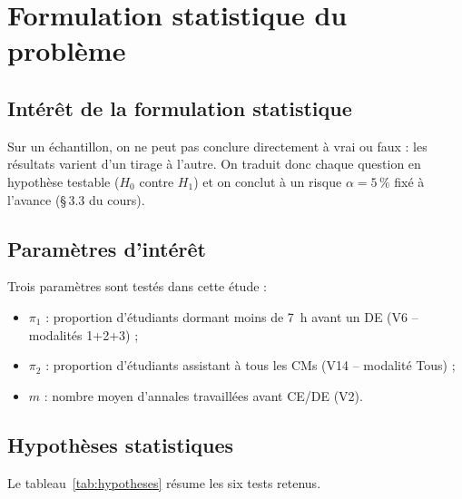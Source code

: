 
\section{Formulation statistique du problème}

\subsection{Intérêt de la formulation statistique}

Sur un échantillon, on ne peut pas conclure directement à \og{}vrai\fg{} ou
\og{}faux\fg{} : les résultats varient d'un tirage à l'autre.
On traduit donc chaque question en hypothèse testable ($H_0$ contre $H_1$) et on
conclut à un risque $\alpha = 5\,\%$ fixé à l'avance (§\,3.3 du cours).

\subsection{Paramètres d'intérêt}

Trois paramètres sont testés dans cette étude :

\begin{itemize}
  \item $\pi_1$ : proportion d'étudiants dormant moins de 7~h avant un DE
        (V6 -- modalités 1+2+3) ;
  \item $\pi_2$ : proportion d'étudiants assistant à tous les CMs
        (V14 -- modalité \og{}Tous\fg{}) ;
  \item $m$ : nombre moyen d'annales travaillées avant CE/DE (V2).
\end{itemize}

\subsection{Hypothèses statistiques}

Le tableau~\ref{tab:hypotheses} résume les six tests retenus.

